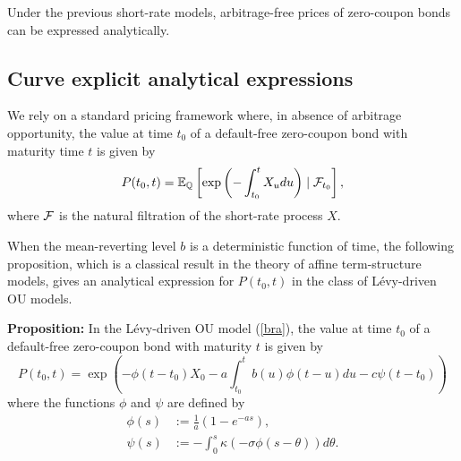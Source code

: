 Under the previous short-rate models, arbitrage-free prices of zero-coupon bonds can be expressed analytically.

\subsection{Curve explicit analytical expressions}

We rely on a standard pricing framework where, in absence of arbitrage opportunity, the value at time $t_0$ of a default-free zero-coupon bond with maturity time $t$ is given by
\begin{equation}
\label{ZC_price}
P(t_0, t) = \mathbb{E}_{\mathbb{Q}}\left[ \exp\left(-\int_{t_{0}}^t{ X_u du}\right) \mid \mathcal{F}_{t_{0}}\right],
\end{equation}
where $\mathcal{F}$ is the natural filtration of the short-rate process $X$.

When the mean-reverting level $b$ is a deterministic function of time, the following proposition, which is a classical result in the theory of affine term-structure models, gives an analytical expression for $P(t_0, t)$ in the class of L\'evy-driven OU models.

\textbf{Proposition: }
\label{Levy-OU:affine}
In the L\'evy-driven OU model (\ref{bra}), the value at time $t_0$ of a default-free zero-coupon bond with maturity $t$ is given by
\begin{equation}
\label{eq1}
P(t_0,t) =\exp\left(-\phi(t-t_0)X_0- a\int_{t_0}^{t}{b(u)\phi(t-u)du} -c\psi(t-t_0)
\right)
\end{equation}
where the functions $\phi$ and $\psi$ are defined by
\begin{align}
\label{eq:phi}
\phi(s)&:=\frac{1}{a}\left(1-e^{-as}\right), \\
\label{eq:psi}
\psi(s)&:=-\int_{0}^{s}{\kappa \left(-\sigma\phi(s-\theta)\right)d\theta}.
\end{align}

